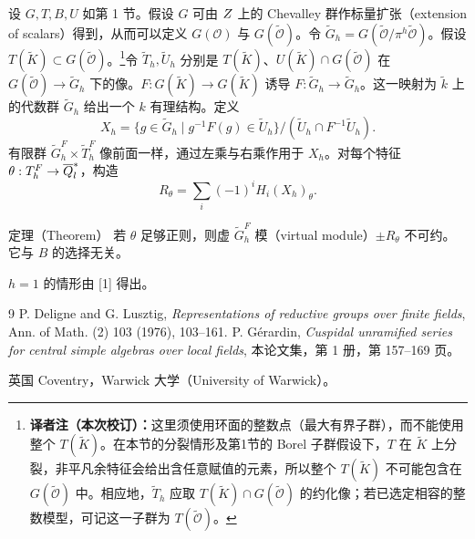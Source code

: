 设 $G,T,B,U$ 如第 1 节。假设 $G$ 可由 $Z$ 上的 Chevalley 群作标量扩张（extension of scalars）得到，从而可以定义 $G(\mathcal O)$ 与 $G(\widetilde{\mathcal O})$。令 $\widetilde G_h=G(\widetilde{\mathcal O}/\pi^h\widetilde{\mathcal O})$。假设 $T(\widetilde K)\subset G(\widetilde{\mathcal O})$。\footnote{\textbf{译者注（本次校订）：}这里须使用环面的整数点（最大有界子群），而不能使用整个 $T(\widetilde K)$。在本节的分裂情形及第1节的 Borel 子群假设下，$T$ 在 $\widetilde K$ 上分裂，非平凡余特征会给出含任意赋值的元素，所以整个 $T(\widetilde K)$ 不可能包含在 $G(\widetilde{\mathcal O})$ 中。相应地，$\widetilde T_h$ 应取 $T(\widetilde K)\cap G(\widetilde{\mathcal O})$ 的约化像；若已选定相容的整数模型，可记这一子群为 $T(\widetilde{\mathcal O})$。}令 $\widetilde T_h,\widetilde U_h$ 分别是 $T(\widetilde K)$、$U(\widetilde K)\cap G(\widetilde{\mathcal O})$ 在 $G(\widetilde{\mathcal O})\to\widetilde G_h$ 下的像。$F:G(\widetilde K)\to G(\widetilde K)$ 诱导 $F:\widetilde G_h\to\widetilde G_h$。这一映射为 $\widetilde k$ 上的代数群 $\widetilde G_h$ 给出一个 $k$ 有理结构。定义
\[
X_h=\{g\in\widetilde G_h\mid g^{-1}F(g)\in\widetilde U_h\}/(\widetilde U_h\cap F^{-1}\widetilde U_h).
\]
有限群 $\widetilde G_h^F\times\widetilde T_h^F$ 像前面一样，通过左乘与右乘作用于 $X_h$。对每个特征 $\theta:T_h^F\to\overline{Q}_l^*$，构造
\[
R_\theta=\sum_i(-1)^iH_i(X_h)_\theta.
\]
\begin{originaltheorem}{定理（Theorem）}
若 $\theta$ 足够正则，则虚 $\widetilde G_h^F$ 模（virtual module）$\pm R_\theta$ 不可约。它与 $B$ 的选择无关。
\end{originaltheorem}
$h=1$ 的情形由 [1] 得出。
\begin{thebibliography}{9}
 P. Deligne and G. Lusztig, \emph{Representations of reductive groups over finite fields}, Ann. of Math. (2) 103 (1976), 103--161.
 P. Gérardin, \emph{Cuspidal unramified series for central simple algebras over local fields}, 本论文集，第 1 册，第 157--169 页。
\end{thebibliography}
\par\noindent 英国 Coventry，Warwick 大学（University of Warwick）。
